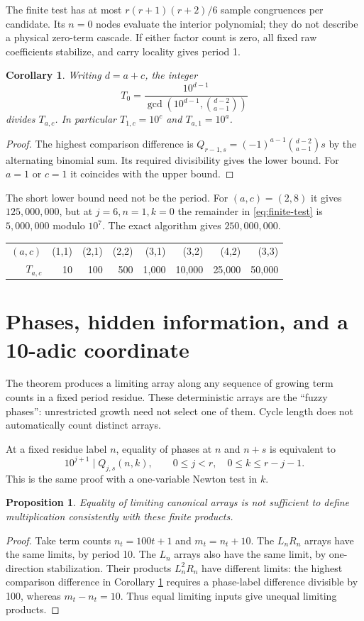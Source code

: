 \documentclass[11pt]{article}
\newtheorem{proposition}[theorem]{Proposition}
\newtheorem{corollary}[theorem]{Corollary}
\begin{document}
The finite test has at most $r(r+1)(r+2)/6$ sample congruences per candidate.
Its $n=0$ nodes evaluate the interior polynomial; they do not describe
a physical zero-term cascade.
If either factor count is zero, all fixed raw coefficients stabilize,
and carry locality gives period 1.

\begin{corollary}\label{cor:bound}
Writing $d=a+c$, the integer
\[
 T_0=\frac{10^{d-1}}{\gcd(10^{d-1},\binom{d-2}{a-1})}
\]
divides $T_{a,c}$. In particular $T_{1,c}=10^c$ and $T_{a,1}=10^a$.
\end{corollary}
\begin{proof}
The highest comparison difference is
$Q_{r-1,s}=(-1)^{a-1}\binom{d-2}{a-1}s$ by the alternating binomial sum.
Its required divisibility gives the lower bound. For $a=1$ or $c=1$
it coincides with the upper bound.
\end{proof}

The short lower bound need not be the period. For $(a,c)=(2,8)$ it gives
$125{,}000{,}000$, but at $j=6,n=1,k=0$ the remainder in
\eqref{eq:finite-test} is $5{,}000{,}000$ modulo $10^7$. The exact
algorithm gives $250{,}000{,}000$.

\begin{center}
\begin{tabular}{rrrrrrrr}
\toprule
$(a,c)$ &(1,1)&(2,1)&(2,2)&(3,1)&(3,2)&(4,2)&(3,3)\\
$T_{a,c}$ &10&100&500&1,000&10,000&25,000&50,000\\
\bottomrule
\end{tabular}
\end{center}

\section{Phases, hidden information, and a 10-adic coordinate}
The theorem produces a limiting array along any sequence of growing term
counts in a fixed period residue. These deterministic arrays are the
``fuzzy phases'': unrestricted growth need not select one of them.
Cycle length does not automatically count distinct arrays.

At a fixed residue label $n$, equality of phases at $n$ and $n+s$ is
equivalent to
\[
 10^{j+1}\mid Q_{j,s}(n,k),\qquad
 0\le j<r,\quad0\le k\le r-j-1.
\]
This is the same proof with a one-variable Newton test in $k$.

\begin{proposition}
Equality of limiting canonical arrays is not sufficient to define
multiplication consistently with these finite products.
\end{proposition}
\begin{proof}
Take term counts $n_t=100t+1$ and $m_t=n_t+10$. The $L_nR_n$ arrays
have the same limits, by period 10. The $L_n$ arrays also have the same
limit, by one-direction stabilization. Their products $L_n^2R_n$ have
different limits: the highest comparison difference in Corollary
\ref{cor:bound} requires a phase-label difference divisible by 100,
whereas $m_t-n_t=10$. Thus equal limiting inputs give unequal limiting
products.
\end{proof}
\end{document}
